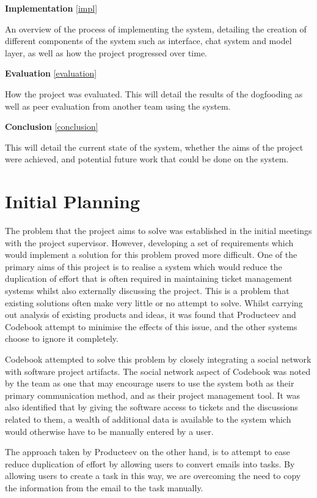 \documentclass[a4paper]{l3proj}
\begin{document}
  \textbf{Implementation} \autoref{impl}

  An overview of the process of implementing the system, detailing the creation of different components of the system such as interface, chat system and model layer, as well as how the project progressed over time.

  \textbf{Evaluation} \autoref{evaluation}

  How the project was evaluated.  This will detail the results of the dogfooding as well as peer evaluation from another team using the system.

  \textbf{Conclusion} \autoref{conclusion}

  This will detail the current state of the system, whether the aims of the project were achieved, and potential future work that could be done on the system.


  \chapter{Initial Planning}
  \label{initialPlanning}

  The problem that the project aims to solve was established in the initial meetings with the project supervisor. However, developing a set of requirements which would implement a solution for this problem proved more difficult. One of the primary aims of this project is to realise a system which would reduce the duplication of effort that is often required in maintaining ticket management systems whilst also externally discussing the project. This is a problem that existing solutions often make very little or no attempt to solve. Whilst carrying out analysis of existing products and ideas, it was found that Producteev and Codebook attempt to minimise the effects of this issue, and the other systems choose to ignore it completely.

  Codebook attempted to solve this problem by closely integrating a social network with software project artifacts. The social network aspect of Codebook was noted by the team as one that may encourage users to use the system both as their primary communication method, and as their project management tool. It was also identified that by giving the software access to tickets and the discussions related to them, a wealth of additional data is available to the system which would otherwise have to be manually entered by a user.

  The approach taken by Producteev on the other hand, is to attempt to ease reduce duplication of effort by allowing users to convert emails into tasks. By allowing users to create a task in this way, we are overcoming the need to copy the information from the email to the task manually.
\end{document}

